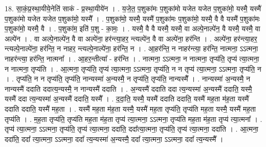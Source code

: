 \documentclass[17pt]{extarticle}
\begin{document}
18. सा॒कं॒प्र॒स्था॒यीये॒नेति॑ साकं - प्र॒स्था॒यीये॑न । . य॒जे॒त॒ प॒शुका॑मः प॒शुका॑मो यजेत यजेत प॒शुका॑मो॒ यस्मै॒ यस्मै॑ प॒शुका॑मो यजेत यजेत प॒शुका॑मो॒ यस्मै᳚ । . प॒शुका॑मो॒ यस्मै॒ यस्मै॑ प॒शुका॑मः प॒शुका॑मो॒ यस्मै॒ वै वै यस्मै॑ प॒शुका॑मः प॒शुका॑मो॒ यस्मै॒ वै । . प॒शुका॑म॒ इति॑ प॒शु - का॒मः॒ । . यस्मै॒ वै वै यस्मै॒ यस्मै॒ वा अल्पे॒नाल्पे॑न॒ वै यस्मै॒ यस्मै॒ वा अल्पे॑न । . वा अल्पे॒नाल्पे॑न॒ वै वा अल्पे॑ना॒ हर॑न्त्या॒हर॒ न्त्यल्पे॑न॒ वै वा अल्पे॑ना॒ हर॑न्ति । . अल्पे॑ना॒ हर॑न्त्या॒हर॒ न्त्यल्पे॒नाल्पे॑ना॒ हर॑न्ति॒ न नाहर॒ न्त्यल्पे॒नाल्पे॑ना॒ हर॑न्ति॒ न । . आ॒हर॑न्ति॒ न नाहर॑न्त्या॒ हर॑न्ति॒ नात्मना॒ ऽऽत्मना॒ नाहर॑न्त्या॒ हर॑न्ति॒ नात्मना᳚ । . आ॒हर॒न्तीत्या᳚ - हर॑न्ति । . नात्मना॒ ऽऽत्मना॒ न नात्मना॒ तृप्य॑ति॒ तृप्य॑ त्या॒त्मना॒ न नात्मना॒ तृप्य॑ति । . आ॒त्मना॒ तृप्य॑ति॒ तृप्य॑ त्या॒त्मना॒ ऽऽत्मना॒ तृप्य॑ति॒ न न तृप्य॑ त्या॒त्मना॒ ऽऽत्मना॒ तृप्य॑ति॒ न । . तृप्य॑ति॒ न न तृप्य॑ति॒ तृप्य॑ति॒ नान्यस्मा॑ अ॒न्यस्मै॒ न तृप्य॑ति॒ तृप्य॑ति॒ नान्यस्मै᳚ । . नान्यस्मा॑ अ॒न्यस्मै॒ न नान्यस्मै॑ ददाति ददात्य॒न्यस्मै॒ न नान्यस्मै॑ ददाति । . अ॒न्यस्मै॑ ददाति ददा त्य॒न्यस्मा॑ अ॒न्यस्मै॑ ददाति॒ यस्मै॒ यस्मै॑ ददा त्य॒न्यस्मा॑ अ॒न्यस्मै॑ ददाति॒ यस्मै᳚ । . द॒दा॒ति॒ यस्मै॒ यस्मै॑ ददाति ददाति॒ यस्मै॑ मह॒ता म॑ह॒ता यस्मै॑ ददाति ददाति॒ यस्मै॑ मह॒ता । . यस्मै॑ मह॒ता म॑ह॒ता यस्मै॒ यस्मै॑ मह॒ता तृप्य॑ति॒ तृप्य॑ति मह॒ता यस्मै॒ यस्मै॑ मह॒ता तृप्य॑ति । . म॒ह॒ता तृप्य॑ति॒ तृप्य॑ति मह॒ता म॑ह॒ता तृप्य॑ त्या॒त्मना॒ ऽऽत्मना॒ तृप्य॑ति मह॒ता म॑ह॒ता तृप्य॑ त्या॒त्मना᳚ । . तृप्य॑ त्या॒त्मना॒ ऽऽत्मना॒ तृप्य॑ति॒ तृप्य॑ त्या॒त्मना॒ ददा॑ति॒ ददा᳚त्या॒त्मना॒ तृप्य॑ति॒ तृप्य॑ त्या॒त्मना॒ ददा॑ति । . आ॒त्मना॒ ददा॑ति॒ ददा᳚ त्या॒त्मना॒ ऽऽत्मना॒ ददा᳚ त्य॒न्यस्मा॑ अ॒न्यस्मै॒ ददा᳚ त्या॒त्मना॒ ऽऽत्मना॒ ददा᳚ त्य॒न्यस्मै᳚ । \newline
\end{document}
